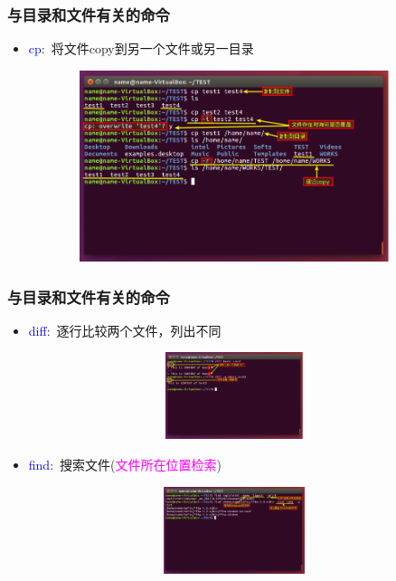 \frame
{
	\frametitle{与目录和文件有关的命令}
	\begin{itemize}
		\item \textcolor{blue}{cp}:~将文件\textrm{copy}到另一个文件或另一目录
\begin{figure}[h!]
\centering
\vspace{-2.5pt}
\includegraphics[height=2.2in,width=3.9in,viewport=0 0 800 470,clip]{Figures/Ubuntu-cp.png}
\label{Linux-command-cp}
\end{figure}
	\end{itemize}
}

\frame
{
	\frametitle{与目录和文件有关的命令}
	\begin{itemize}
\setlength{\itemsep}{-10pt}
		\item \textcolor{blue}{diff}:~逐行比较两个文件，列出不同
\begin{figure}[h!]
\centering
\vspace{-11.5pt}
\includegraphics[height=1.0in,width=3.9in,viewport=0 250 800 470,clip]{Figures/Ubuntu-diff.png}
\label{Linux-command-diff}
\end{figure}
		\item \textcolor{blue}{find}:~搜索文件\textrm{(\textcolor{magenta}{文件所在位置检索})}
\begin{figure}[h!]
\centering
\vspace{-11.5pt}
\includegraphics[height=1.0in,width=3.9in,viewport=0 270 800 470,clip]{Figures/Ubuntu-find.png}
\label{Linux-command-find}
\end{figure}
\end{itemize}
}

